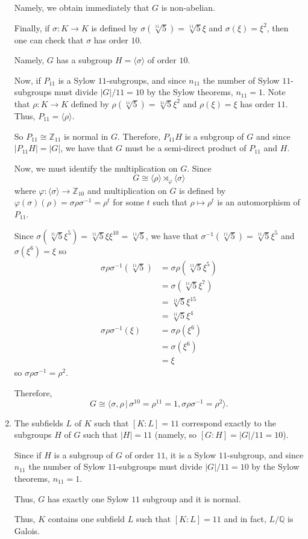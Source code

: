 \documentclass[12pt]{AlgebraQual}
\begin{document}
\begin{solution}
\begin{enumerate}[label=(\alph*)]
    Namely, we obtain immediately that $G$ is non-abelian.

    Finally, if $\sigma:K\to K$ is defined by $\sigma(\sqrt[11]{5})=\sqrt[11]{5}\xi$ and $\sigma(\xi)=\xi^2$, then one can check that $\sigma$ has order $10$.

    Namely, $G$ has a subgroup $H=\langle\sigma\rangle$ of order $10$.

    Now, if $P_{11}$ is a Sylow $11$-subgroups, and since $n_{11}$ the number of Sylow $11$-subgroups must divide $|G|/11=10$ by the Sylow theorems, $n_{11}=1$. Note that $\rho:K\to K$ defined by $\rho(\sqrt[11]{5})=\sqrt[11]{5}\xi^2$ and $\rho(\xi)=\xi$ has order $11$. Thus, $P_{11}=\langle \rho\rangle.$

    So $P_{11}\cong\mathbb{Z}_{11}$ is normal in $G$. Therefore, $P_{11}H$ is a subgroup of $G$ and since $|P_{11}H|=|G|$, we have that $G$ must be a semi-direct product of $P_{11}$ and $H$.

    Now, we must identify the multiplication on $G$. Since $$G\cong \langle \rho\rangle\rtimes_\varphi \langle\sigma\rangle$$ where $\varphi:\langle \sigma\rangle\to\mathbb{Z}_{10}$ and multiplication on $G$ is defined by $\varphi(\sigma)(\rho)=\sigma\rho\sigma^{-1}=\rho^t$ for some $t$ such that $\rho\mapsto \rho^t$ is an automorphism of $P_{11}$.

    Since $\sigma(\sqrt[11]{5}\xi^5)=\sqrt[11]{5}\xi\xi^{10}=\sqrt[11]{5}$, we have that $\sigma^{-1}(\sqrt[11]{5})=\sqrt[11]{5}\xi^5$ and $\sigma(\xi^6)=\xi$ so  \begin{align*}
        \sigma\rho\sigma^{-1}(\sqrt[11]{5})&=\sigma\rho(\sqrt[11]{5}\xi^5)\\
        &=\sigma(\sqrt[11]{5}\xi^7)\\
        &=\sqrt[11]{5}\xi^{15}\\
        &=\sqrt[11]{5}\xi^4\\
        \sigma\rho\sigma^{-1}(\xi)&=\sigma\rho(\xi^6)\\
        &=\sigma(\xi^6)\\
        &=\xi
    \end{align*} so $\sigma\rho\sigma^{-1}=\rho^2.$

    Therefore, $$G\cong\langle \sigma,\rho\,|\,\sigma^{10}=\rho^{11}=1,\sigma\rho\sigma^{-1}=\rho^2\rangle.$$

    \item The subfields $L$ of $K$ such that $[K:L]=11$ correspond exactly to the subgroups $H$ of $G$ such that $|H|=11$ (namely, so $[G:H]=|G|/11=10$).

    Since if $H$ is a subgroup of $G$ of order $11$, it is a Sylow $11$-subgroup, and since $n_{11}$ the number of Sylow $11$-subgroups must divide $|G|/11=10$ by the Sylow theorems, $n_{11}=1$.

    Thus, $G$ has exactly one Sylow $11$ subgroup and it is normal.

    Thus, $K$ contains one subfield $L$ such that $[K:L]=11$ and in fact, $L/\mathbb{Q}$ is Galois.
\end{enumerate}
\end{solution}
\newpage
\end{document}
